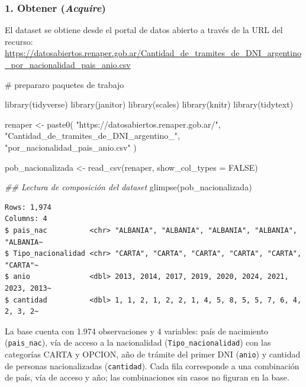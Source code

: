 \documentclass[
  letterpaper,
  DIV=11,
  numbers=noendperiod]{scrartcl}
\newenvironment{Shaded}{\begin{snugshade}}{\end{snugshade}}
\newcommand{\AttributeTok}[1]{\textcolor[rgb]{0.40,0.45,0.13}{#1}}
\newcommand{\CommentTok}[1]{\textcolor[rgb]{0.37,0.37,0.37}{#1}}
\newcommand{\ConstantTok}[1]{\textcolor[rgb]{0.56,0.35,0.01}{#1}}
\newcommand{\DocumentationTok}[1]{\textcolor[rgb]{0.37,0.37,0.37}{\textit{#1}}}
\newcommand{\FunctionTok}[1]{\textcolor[rgb]{0.28,0.35,0.67}{#1}}
\newcommand{\NormalTok}[1]{\textcolor[rgb]{0.00,0.23,0.31}{#1}}
\newcommand{\OtherTok}[1]{\textcolor[rgb]{0.00,0.23,0.31}{#1}}
\newcommand{\StringTok}[1]{\textcolor[rgb]{0.13,0.47,0.30}{#1}}
\begin{document}
\subsubsection{\texorpdfstring{1. Obtener
(\emph{Acquire})}{1. Obtener (Acquire)}}\label{obtener-acquire}

El dataset se obtiene desde el portal de datos abierto a través de la
URL del recurso:
\url{https://datosabiertos.renaper.gob.ar/Cantidad_de_tramites_de_DNI_argentino_por_nacionalidad_pais_anio.csv}

\begin{Shaded}
\begin{Highlighting}[]
\CommentTok{\# prepararo paquetes de trabajo}

\FunctionTok{library}\NormalTok{(tidyverse)}
\FunctionTok{library}\NormalTok{(janitor)}
\FunctionTok{library}\NormalTok{(scales)}
\FunctionTok{library}\NormalTok{(knitr)}
\FunctionTok{library}\NormalTok{(tidytext)}
\end{Highlighting}
\end{Shaded}

\begin{Shaded}
\begin{Highlighting}[]
\NormalTok{renaper }\OtherTok{\textless{}{-}} \FunctionTok{paste0}\NormalTok{(}
  \StringTok{"https://datosabiertos.renaper.gob.ar/"}\NormalTok{,}
  \StringTok{"Cantidad\_de\_tramites\_de\_DNI\_argentino\_"}\NormalTok{,}
  \StringTok{"por\_nacionalidad\_pais\_anio.csv"}
\NormalTok{)}

\NormalTok{pob\_nacionalizada }\OtherTok{\textless{}{-}} \FunctionTok{read\_csv}\NormalTok{(renaper, }\AttributeTok{show\_col\_types =} \ConstantTok{FALSE}\NormalTok{)}

\DocumentationTok{\#\# Lectura de composición del  dataset}
\FunctionTok{glimpse}\NormalTok{(pob\_nacionalizada)}
\end{Highlighting}
\end{Shaded}

\begin{verbatim}
Rows: 1,974
Columns: 4
$ pais_nac          <chr> "ALBANIA", "ALBANIA", "ALBANIA", "ALBANIA", "ALBANIA~
$ Tipo_nacionalidad <chr> "CARTA", "CARTA", "CARTA", "CARTA", "CARTA", "CARTA"~
$ anio              <dbl> 2013, 2014, 2017, 2019, 2020, 2024, 2021, 2023, 2013~
$ cantidad          <dbl> 1, 1, 2, 1, 2, 2, 1, 4, 5, 8, 5, 5, 7, 6, 4, 2, 3, 2~
\end{verbatim}

La base cuenta con 1.974 observaciones y 4 variables: país de nacimiento
(\texttt{pais\_nac}), vía de acceso a la nacionalidad
(\texttt{Tipo\_nacionalidad}) con las categorías CARTA y OPCION, año de
trámite del primer DNI (\texttt{anio}) y cantidad de personas
nacionalizadas (\texttt{cantidad}). Cada fila corresponde a una
combinación de país, vía de acceso y año; las combinaciones sin casos no
figuran en la base.
\end{document}
